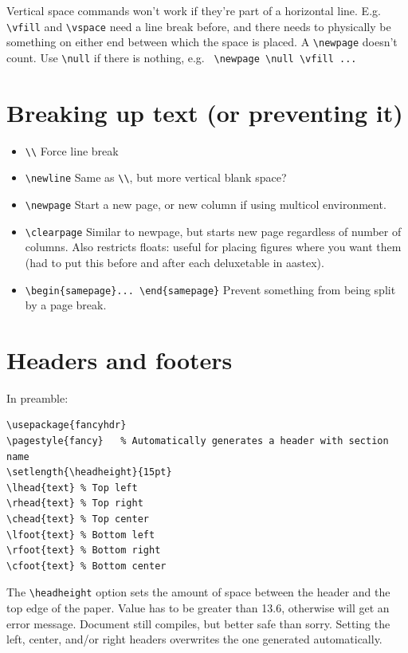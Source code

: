 \documentclass{article}
\begin{document}
Vertical space commands won't work if they're part of a horizontal line.
E.g. \verb|\vfill| and \verb|\vspace| need a line break before, and there needs
to physically be something on either end between which the space is placed.
A \verb|\newpage| doesn't count. Use \verb|\null| if there is nothing, e.g.
\verb| \newpage \null \vfill ... |

\section{Breaking up text (or preventing it)}
\begin{itemize}
    \item \verb|\\| Force line break
    \item \verb|\newline| Same as \verb|\\|, but more vertical blank space?
    \item \verb|\newpage| Start a new page, or new column if using multicol
        environment.
    \item \verb|\clearpage| Similar to newpage, but starts new page regardless
        of number of columns. Also restricts floats: useful
        for placing figures where you want them (had to put this before and after
        each deluxetable in aastex).
    \item \verb|\begin{samepage}... \end{samepage}| Prevent something from
        being split by a page break.
\end{itemize}

\section{Headers and footers}\label{headfoot}
In preamble:
\begin{lstlisting}
\usepackage{fancyhdr}
\pagestyle{fancy}   % Automatically generates a header with section name
\setlength{\headheight}{15pt}
\lhead{text} % Top left
\rhead{text} % Top right
\chead{text} % Top center
\lfoot{text} % Bottom left
\rfoot{text} % Bottom right
\cfoot{text} % Bottom center
\end{lstlisting}

The \verb|\headheight| option sets the amount of space between the
header and the top edge of the paper. Value has to be greater than
13.6, otherwise will get an error message. Document still
compiles, but better safe than sorry. Setting the left, center, and/or
right headers overwrites the one generated automatically.
\end{document}
